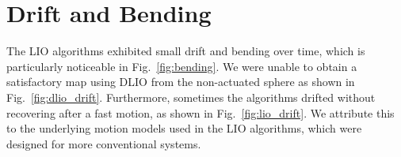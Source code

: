 \documentclass[english, bachelor, utf8]{base/thesis_telematics}
\begin{document}
\section{Drift and Bending}
The LIO algorithms exhibited small drift and bending over time, which is particularly noticeable in Fig.~\ref{fig:bending}. 
We were unable to obtain a satisfactory map using DLIO from the non-actuated sphere as shown in Fig.~\ref{fig:dlio_drift}.
Furthermore, sometimes the algorithms drifted without recovering after a fast motion, as shown in Fig.~\ref{fig:lio_drift}. 
We attribute this to the underlying motion models used in the LIO algorithms, which were designed for more conventional systems.

\end{document}
